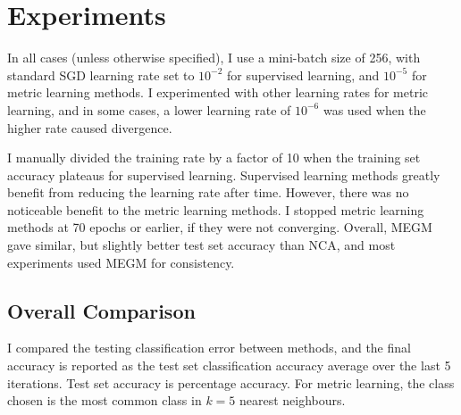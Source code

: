 \section {Experiments}

In all cases (unless otherwise specified), I use a mini-batch size of 256, with standard \gls{SGD} learning rate set to $ 10^{-2} $ for supervised learning, and $ 10^{-5} $ for metric learning methods. I experimented with other learning rates for metric learning, and in some cases, a lower learning rate of $ 10^{-6} $ was used when the higher rate caused divergence.

I manually divided the training rate by a factor of 10 when the training set accuracy plateaus for supervised learning. Supervised learning methods greatly benefit from reducing the learning rate after time. However, there was no noticeable benefit to the metric learning methods. I stopped metric learning methods at 70 epochs or earlier, if they were not converging. Overall, \gls{MEGM} gave similar, but slightly better test set accuracy than \gls{NCA}, and most experiments used \gls{MEGM} for consistency.


\subsection{Overall Comparison}

I compared the testing classification error between methods, and the final accuracy is reported as the test set classification accuracy average over the last 5 iterations. Test set accuracy is percentage accuracy. For metric learning, the class chosen is the most common class in $k = 5$ nearest neighbours.


